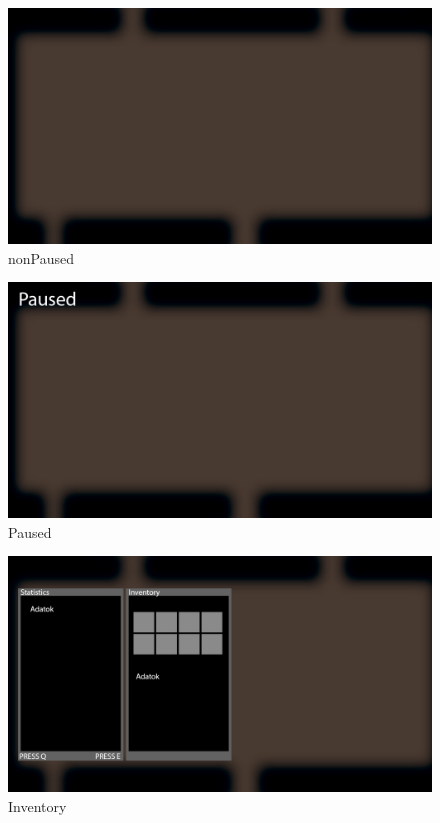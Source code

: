 \begin{figure}[!ht]
	\centering
	\includegraphics[scale=0.3]{images/nonPaused.png}
	\caption{nonPaused}
	\label{fig:nonPaused}
\end{figure}

\begin{figure}[!ht]
	\centering
	\includegraphics[scale=0.3]{images/Paused.png}
	\caption{Paused}
	\label{fig:Paused}
\end{figure}

\begin{figure}[!ht]
	\centering
	\includegraphics[scale=0.3]{images/Inventory.png}
	\caption{Inventory}
	\label{fig:Inventory}
\end{figure}

